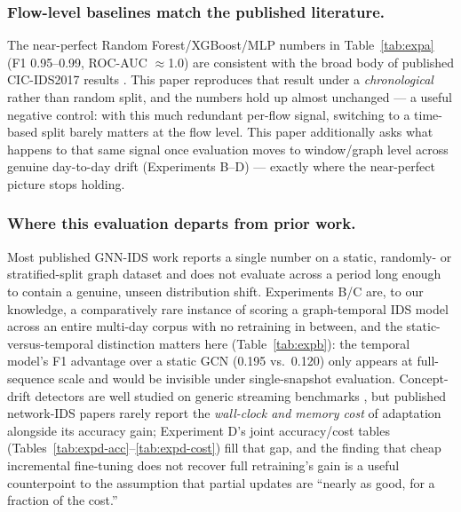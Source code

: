 \documentclass[twocolumn]{llncs}
\begin{document}
\subsubsection{Flow-level baselines match the published literature.} The near-perfect Random
Forest/XGBoost/MLP numbers in Table~\ref{tab:expa} (F1 0.95--0.99, ROC-AUC $\approx$1.0) are
consistent with the broad body of published CIC-IDS2017 results
\cite{sharafaldin2018cicids2017,vedash2026xai,akanksha2025malware,ravi2025flowmetadata}. This
paper reproduces that result under a \emph{chronological} rather than random split, and the numbers
hold up almost unchanged --- a useful negative control: with this much redundant per-flow signal,
switching to a time-based split barely matters at the flow level. This paper additionally asks what
happens to that same signal once evaluation moves to window/graph level across genuine day-to-day
drift (Experiments B--D) --- exactly where the near-perfect picture stops holding.

\subsubsection{Where this evaluation departs from prior work.} Most published GNN-IDS work reports a
single number on a static, randomly- or stratified-split graph dataset and does not evaluate across
a period long enough to contain a genuine, unseen distribution shift. Experiments B/C are, to our
knowledge, a comparatively rare instance of scoring a graph-temporal IDS model across an entire
multi-day corpus with no retraining in between, and the static-versus-temporal distinction matters
here (Table~\ref{tab:expb}): the temporal model's F1 advantage over a static GCN (0.195 vs.\ 0.120)
only appears at full-sequence scale and would be invisible under single-snapshot evaluation.
Concept-drift detectors are well studied on generic streaming benchmarks
\cite{bifet2007adwin,gama2014survey}, but published network-IDS papers rarely report the
\emph{wall-clock and memory cost} of adaptation alongside its accuracy gain; Experiment D's joint
accuracy/cost tables (Tables~\ref{tab:expd-acc}--\ref{tab:expd-cost}) fill that gap, and the finding
that cheap incremental fine-tuning does not recover full retraining's gain is a useful counterpoint
to the assumption that partial updates are ``nearly as good, for a fraction of the cost.''
\end{document}
